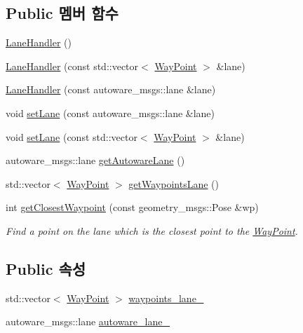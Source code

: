 \subsection*{Public 멤버 함수}
\begin{DoxyCompactItemize}
\item 
\hyperlink{class_lane_handler_ac8a26880811b795d49d9b3578d3f03fb}{Lane\+Handler} ()
\item 
\hyperlink{class_lane_handler_af9236889af0e7d75ca3230d47175a9b5}{Lane\+Handler} (const std\+::vector$<$ \hyperlink{class_way_point}{Way\+Point} $>$ \&lane)
\item 
\hyperlink{class_lane_handler_af00842c287a4ea45b48a0d928b861048}{Lane\+Handler} (const autoware\+\_\+msgs\+::lane \&lane)
\item 
void \hyperlink{class_lane_handler_a6c4cc7f5ae19a81cd24ba1427b0afb74}{set\+Lane} (const autoware\+\_\+msgs\+::lane \&lane)
\item 
void \hyperlink{class_lane_handler_a33776b288c92ee7e63f865e6c9526ff3}{set\+Lane} (const std\+::vector$<$ \hyperlink{class_way_point}{Way\+Point} $>$ \&lane)
\item 
autoware\+\_\+msgs\+::lane \hyperlink{class_lane_handler_a9d66775c597130ccbd369d50c7572c2e}{get\+Autoware\+Lane} ()
\item 
std\+::vector$<$ \hyperlink{class_way_point}{Way\+Point} $>$ \hyperlink{class_lane_handler_afe241272b5017d7d0e439d08bbf855d9}{get\+Waypoints\+Lane} ()
\item 
int \hyperlink{class_lane_handler_a71033c4e67c07e09c2c3c18fabfb7463}{get\+Closest\+Waypoint} (const geometry\+\_\+msgs\+::\+Pose \&wp)
\begin{DoxyCompactList}\small\item\em Find a point on the lane which is the closest point to the \hyperlink{class_way_point}{Way\+Point}. \end{DoxyCompactList}\end{DoxyCompactItemize}
\subsection*{Public 속성}
\begin{DoxyCompactItemize}
\item 
std\+::vector$<$ \hyperlink{class_way_point}{Way\+Point} $>$ \hyperlink{class_lane_handler_ac65a0139b3900a7c8dc3fe49d7a684f3}{waypoints\+\_\+lane\+\_\+}
\item 
autoware\+\_\+msgs\+::lane \hyperlink{class_lane_handler_a167378a780eafb8242f7b12bd5460ac0}{autoware\+\_\+lane\+\_\+}
\end{DoxyCompactItemize}
